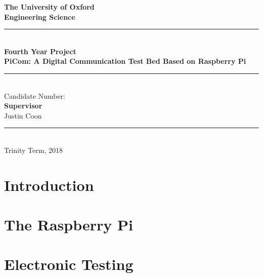 \documentclass[a4paper,11pt]{report}
\begin{document}
\begin{titlepage}
\begin{center}
\vspace*{1cm}
\Large {\textbf{The University of Oxford}}\\
\Large{\textbf{Engineering Science}}\\
\vfill
\noindent\rule{5in}{0.6pt}\\[1mm]
\huge{\textbf{Fourth Year Project}}\\[3mm]
\Large{\textbf{PiCom: A Digital Communication Test Bed Based on Raspberry Pi}}\\[3mm]
\noindent\rule{5in}{0.6pt}\\[1mm]
Candidate Number:\\
\textbf{Supervisor}\\
Justin Coon\\
\noindent\rule{5in}{0.6pt}\\[1mm]
\vfill
Trinity Term, 2018\\
\end{center}
\end{titlepage}

\begin{abstract}
\graphicspath{{./Sections/Images/}}

\end{abstract}

\thispagestyle{empty}
\tableofcontents

\listoftodos

\chapter{Introduction}
\graphicspath{{./Sections/Images/}}


\chapter{The Raspberry Pi}
\graphicspath{{./Sections/Images/}}


\chapter{Electronic Testing}
\graphicspath{{./Sections/Images/}}

\end{document}

